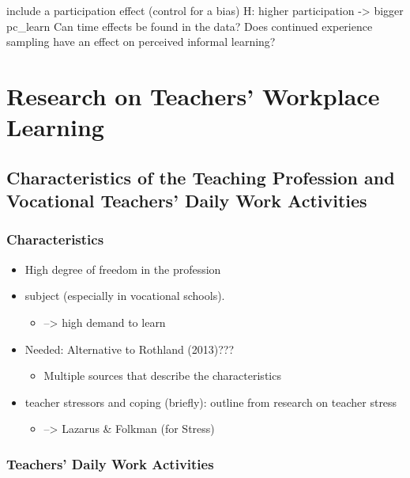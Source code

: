 \documentclass[
]{article}
\providecommand{\tightlist}{%
  \setlength{\itemsep}{0pt}\setlength{\parskip}{0pt}}
\begin{document}
include a participation effect (control for a bias) H: higher
participation -\textgreater{} bigger pc\_learn Can time effects be found
in the data? Does continued experience sampling have an effect on
perceived informal learning?

\section{Research on Teachers' Workplace
Learning}\label{research-on-teachers-workplace-learning}

\subsection{Characteristics of the Teaching Profession and Vocational
Teachers' Daily Work
Activities}\label{characteristics-of-the-teaching-profession-and-vocational-teachers-daily-work-activities}

\subsubsection{Characteristics}\label{characteristics}

\begin{itemize}
\item
  High degree of freedom in the profession
\item
  subject (especially in vocational schools).

  \begin{itemize}
  \tightlist
  \item
    --\textgreater{} high demand to learn
  \end{itemize}
\item
  Needed: Alternative to Rothland (2013)???

  \begin{itemize}
  \tightlist
  \item
    Multiple sources that describe the characteristics
  \end{itemize}
\item
  teacher stressors and coping (briefly): outline from research on
  teacher stress

  \begin{itemize}
  \tightlist
  \item
    --\textgreater{} Lazarus \& Folkman (for Stress)
  \end{itemize}
\end{itemize}

\subsubsection{Teachers' Daily Work
Activities}\label{teachers-daily-work-activities}
\end{document}
